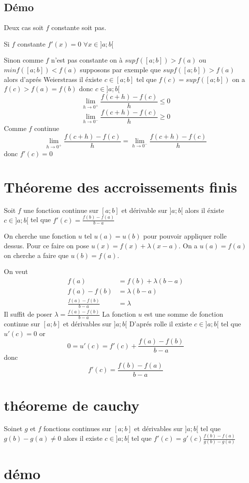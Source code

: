 \documentclass[a4paper,10pt]{article}
\begin{document}
\subsection{Démo}
Deux cas soit $f$ constante soit pas.


Si $f$ constante $f'(x) = 0$ $ \forall x \in ]a;b[$


Sinon comme $f$ n'est pas constante on à $sup f([a; b]) > f(a)$ ou $min f([a; b]) < f(a)$
supposons par exemple que $sup f([a; b]) > f(a)$ alors d'aprés Weierstrass il éxiste $c \in [a; b]$
tel que $f(c) = sup f([a; b])$ on a $f(c) > f(a) = f(b)$ donc $c \in ]a;b[$
\[\lim_{h \to 0^{+}} \frac{f(c + h) - f(c)}{h} \leq 0\]
\[\lim_{h \to 0^{-}} \frac{f(c + h) - f(c)}{h} \geq 0\]
Comme $f$ continue \[\lim_{h \to 0^{+}} \frac{f(c + h) - f(c)}{h} = \lim_{h \to 0^{-}} \frac{f(c + h) - f(c)}{h}\]
donc $f'(c) = 0$
\section{Théoreme des accroissements finis}
Soit $f$ une fonction continue sur $[a; b]$ et dérivable sur $]a;b[$ alors il éxiste
$c \in ]a;b[$ tel que $f'(c) = \frac{f(b) - f(a)}{b - a}$


On cherche une fonction $u$ tel $u(a) = u(b)$ pour pouvoir appliquer rolle dessus. Pour ce faire on pose $u(x) = f(x) + \lambda (x - a)$.
On a $u(a) = f(a)$ on cherche a faire que $u(b) = f(a)$.


On veut 
\begin{align*}
f(a) &= f(b) + \lambda(b - a)\\
f(a) - f(b) &= \lambda(b - a)\\
\frac{f(a) - f(b)}{b - a} &= \lambda
\end{align*}
Il suffit de poser $\lambda = \frac{f(a) - f(b)}{b - a}$
La fonction $u$ est une somme de fonction continue sur $[a;b]$ et dérivables sur $]a; b[$
D'aprés rolle il existe $c \in ]a;b[$ tel que $u'(c) = 0$ or
\[0 = u'(c) = f'(c) + \frac{f(a) - f(b)}{b - a}\]
donc \[f'(c) =  \frac{f(b) - f(a)}{b - a}\]

\section{théoreme de cauchy}
Soinet $g$ et $f$ fonctions continues sur $[a; b]$ et dérivables sur $]a;b[$ tel que $g(b) - g(a) \neq 0$
alors il existe $c \in ]a;b[$ tel que $f'(c) = g'(c)\frac{f(b) - f(a)}{g(b) - g(a)}$


\section{démo}
\end{document}
